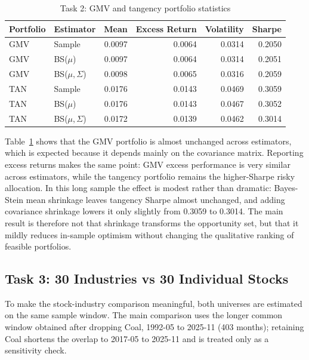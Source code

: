 \documentclass[11pt,a4paper]{article}
\begin{document}
\begin{table}[H]
\centering
\caption{Task 2: GMV and tangency portfolio statistics}
\label{tab:scope2}
\small
\begin{tabular}{llrrrr}
\toprule
Portfolio & Estimator & Mean & Excess Return & Volatility & Sharpe \\
\midrule
GMV & Sample & 0.0097 & 0.0064 & 0.0314 & 0.2050 \\
GMV & BS($\mu$) & 0.0097 & 0.0064 & 0.0314 & 0.2051 \\
GMV & BS($\mu,\Sigma$) & 0.0098 & 0.0065 & 0.0316 & 0.2059 \\
TAN & Sample & 0.0176 & 0.0143 & 0.0469 & 0.3059 \\
TAN & BS($\mu$) & 0.0176 & 0.0143 & 0.0467 & 0.3052 \\
TAN & BS($\mu,\Sigma$) & 0.0172 & 0.0139 & 0.0462 & 0.3014 \\
\bottomrule
\end{tabular}
\end{table}

Table~\ref{tab:scope2} shows that the GMV portfolio is almost unchanged across estimators, which is expected because it depends mainly on the covariance matrix. Reporting excess returns makes the same point: GMV excess performance is very similar across estimators, while the tangency portfolio remains the higher-Sharpe risky allocation. In this long sample the effect is modest rather than dramatic: Bayes-Stein mean shrinkage leaves tangency Sharpe almost unchanged, and adding covariance shrinkage lowers it only slightly from 0.3059 to 0.3014. The main result is therefore not that shrinkage transforms the opportunity set, but that it mildly reduces in-sample optimism without changing the qualitative ranking of feasible portfolios.

\subsection{Task 3: 30 Industries vs 30 Individual Stocks}
To make the stock-industry comparison meaningful, both universes are estimated on the same sample window. The main comparison uses the longer common window obtained after dropping Coal, 1992-05 to 2025-11 (403 months); retaining Coal shortens the overlap to 2017-05 to 2025-11 and is treated only as a sensitivity check.
\end{document}
